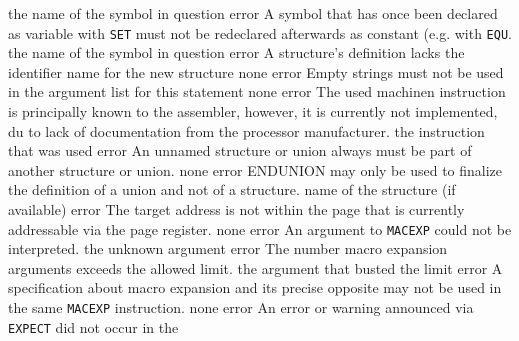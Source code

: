 \documentclass[12pt,twoside]{report}
\newcommand{\tty}[1]{{\tt #1}}
\begin{document}
\begin{description}
               {the name of the symbol in question}
               {error}
               {A symbol that has once been declared as variable with
                {\tt SET} must not be redeclared afterwards as constant
                (e.g. with {\tt EQU}.}
               {the name of the symbol in question}
               {error}
               {A structure's definition lacks the identifier name for the
                new structure}
               {none}
               {error}
               {Empty strings must not be used in the argument list for
                this statement}
               {none}
               {error}
               {The used machinen instruction is principally known
                to the assembler, however, it is currently not
                implemented, du to lack of documentation from the
                processor manufacturer.}
               {the instruction that was used}
               {error}
               {An unnamed structure or union always must be part
                of another structure or union.}
               {none}
               {error}
               {ENDUNION may only be used to finalize the definition
                of a union and not of a structure.}
               {name of the structure (if available)}
               {error}
               {The target address is not within the page
                that is currently addressable via the page
                register.}
               {none}
               {error}
               {An argument to \tty{MACEXP} could not be
                interpreted.}
               {the unknown argument}
               {error}
               {The number macro expansion arguments exceeds the allowed limit.}
               {the argument that busted the limit}
               {error}
               {A specification about macro expansion and its
                precise opposite may not be used in the same
                \tty{MACEXP} instruction.}
               {none}
               {error}
               {An error or warning announced via {\tt EXPECT} did not occur in the
}
\end{description}
\end{document}
